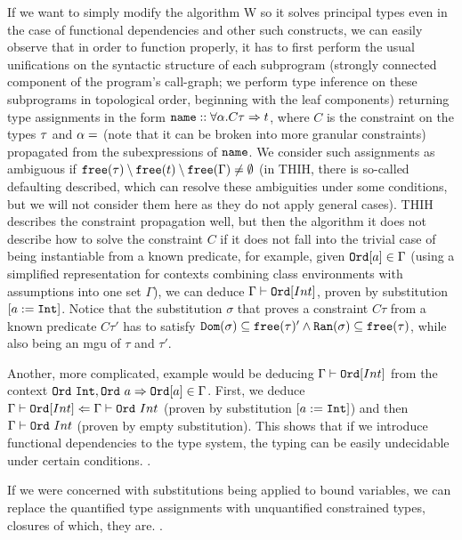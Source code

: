 If we want to simply modify the algorithm W so it solves principal types even in the case of functional dependencies and other such constructs, we can easily observe that in order to function properly, it has to first perform the usual unifications on the syntactic structure of each subprogram (strongly connected component of the program's call-graph; we perform type inference on these subprograms in topological order, beginning with the leaf components) returning type assignments in the form $\mathtt{name} :: \forall \boldmath \alpha . C \boldmath \tau \Rightarrow t$, where $C$ is the constraint on the types $\boldmath \tau$ and $\boldmath \alpha = $ (note that it can be broken into more granular constraints) propagated from the subexpressions of $\mathtt{name}$. We consider such assignments as ambiguous if $\mathtt{free} (\tau) \setminus \mathtt{free} (t) \setminus \mathtt{free} (\Gamma) \neq \emptyset$ (in THIH, there is so-called defaulting described, which can resolve these ambiguities under some conditions, but we will not consider them here as they do not apply general cases). THIH describes the constraint propagation well, but then the algorithm it does not describe how to solve the constraint $C$ if it does not fall into the trivial case of being instantiable from a known predicate, for example, given $\mathtt{Ord} [a] \in \Gamma$ (using a simplified representation for contexts combining class environments with assumptions into one set $\Gamma$), we can deduce $\Gamma \vdash \mathtt{Ord} [Int]$, proven by substitution $[a := \mathtt{Int}]$. Notice that the substitution $\sigma$ that proves a constraint $C \tau$ from a known predicate $C \tau'$ has to satisfy $\mathtt{Dom} (\sigma) \subseteq \mathtt{free} (\tau)' \land \mathtt{Ran} (\sigma) \subseteq \mathtt{free} (\tau)$, while also being an mgu  of $\tau$ and $\tau'$.  

Another, more complicated, example would be deducing $\Gamma \vdash \mathtt{Ord} [Int]$ from the context $\mathtt{Ord}\ \mathtt{Int}, \mathtt{Ord}\ a \Rightarrow \mathtt{Ord} [a] \in \Gamma$. First, we deduce $\Gamma \vdash \mathtt{Ord} [Int] \Leftarrow \Gamma \vdash \mathtt{Ord}\ Int$ (proven by substitution $[a := \mathtt{Int}]$) and then $\Gamma \vdash \mathtt{Ord}\ Int$ (proven by empty substitution). This shows that if we introduce functional dependencies to the type system, the typing can be easily undecidable under certain conditions. .

If we were concerned with substitutions being applied to bound variables, we can replace the quantified type assignments with unquantified constrained types, closures of which, they are. .

